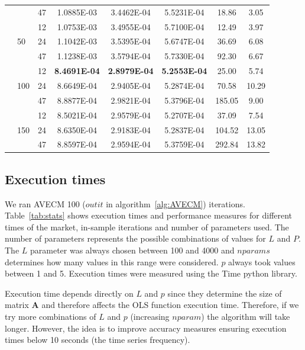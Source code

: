 \begin{table}[ht!]
\begin{center}
\begin{tabular}{|l|l|l|c|c|c|c|c|}
 &&  47 & 1.0885E-03 & 3.4462E-04 & 5.5231E-04 & 18.86 & 3.05 \\
 \cline{2-8} 
 & \multirow{3}{*}{50} 
 &  12& 1.0753E-03 & 3.4955E-04 & 5.7100E-04 & 12.49 & 3.97 \\ 
 && 24 &1.1042E-03 & 3.5395E-04 & 5.6747E-04 & 36.69 & 6.08 \\ 
 && 47 &1.1238E-03 & 3.5794E-04 & 5.7330E-04 & 92.30 & 6.67 \\ 
 \cline{2-8} 
 & \multirow{3}{*}{100} 
 &  12& \textbf{8.4691E-04} & \textbf{2.8979E-04} & \textbf{5.2553E-04} & 25.00 & 5.74 \\ 
 && 24 &8.6649E-04 & 2.9405E-04 & 5.2874E-04 & 70.58 & 10.29 \\
 && 47 &8.8877E-04 & 2.9821E-04 & 5.3796E-04 & 185.05 & 9.00 \\
 \cline{2-8} 
 & \multirow{3}{*}{150} 
 &  12& 8.5021E-04 & 2.9579E-04 & 5.2707E-04 & 37.09 & 7.54 \\ 
 && 24 &8.6350E-04 & 2.9183E-04 & 5.2837E-04 & 104.52 & 13.05 \\
 && 47 &8.8597E-04 & 2.9594E-04 & 5.3759E-04 & 292.84 & 13.82 \\
\hline
\end{tabular}
\end{center}
\end{table}





\subsection{Execution times} \label{sec:exectimes}
We ran AVECM 100 ($outit$ in algorithm~\ref{alg:AVECM}) iterations.
Table~\ref{tab:stats} shows execution times and performance measures for
different times of the market, in-sample iterations and number of parameters used.
The number of parameters represents the possible combinations of values for $L$ and
$P$. The $L$ parameter was always chosen between 100 and 4000 and $nparams$
determines how many values in this range were considered. $p$ always took values
between 1 and 5. Execution times were measured using the Time python library.

Execution time depends directly on $L$ and $p$ since they determine the size of
matrix $\mathbf{A}$ and therefore affects the OLS function execution time.
Therefore, if we try more combinations of $L$ and $p$ (increasing $nparam$) the
algorithm will take longer. However, the idea is to improve accuracy measures
ensuring execution times below 10 seconds (the time series frequency). 

